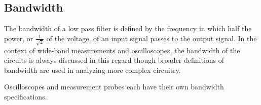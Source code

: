 \documentclass[main.tex]{subfiles}
\begin{document}
\subsection{Bandwidth}
The bandwidth of a low pass filter is defined by the frequency in which half the power, or $\frac{1}{\sqrt{2}}$ of the voltage, of an input signal passes to the output signal. In the context of wide-band measurements and oscilloscopes, the bandwidth of the circuits is always discussed in this regard though broader definitions of bandwidth are used in analyzing more complex circuitry.

Oscilloscopes and measurement probes each have their own bandwidth specifications. 
\end{document}
